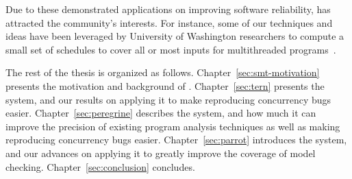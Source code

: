 Due to these demonstrated applications on improving software reliability, \smt 
has attracted the community's interests. For instance, some of our \smt 
techniques and ideas have been leveraged by University of Washington 
researchers to compute a small set of schedules to cover all or most inputs for 
multithreaded programs~\cite{bergan:oopsla13}.

The rest of the thesis is organized as follows. Chapter~\ref{sec:smt-motivation}
presents the motivation and background of \smt. Chapter~\ref{sec:tern} presents
the \tern system, and our results on applying it to make reproducing concurrency
bugs easier. Chapter~\ref{sec:peregrine} describes the \peregrine system, and
how much it can improve the precision of existing program analysis techniques as
well as making reproducing concurrency bugs easier. Chapter~\ref{sec:parrot}
introduces the \parrot system, and our advances on applying it to greatly
improve the coverage of model checking. Chapter~\ref{sec:conclusion} concludes.



